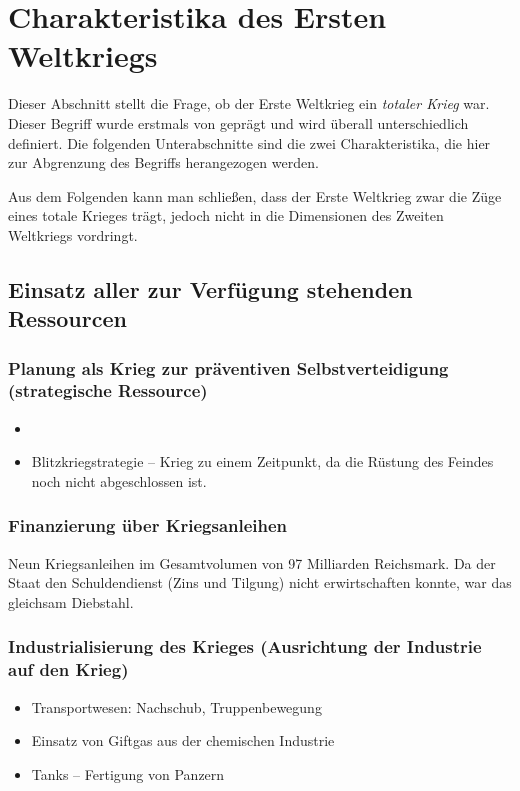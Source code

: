 \section{Charakteristika des Ersten Weltkriegs}

Dieser Abschnitt stellt die Frage, ob der Erste Weltkrieg ein
\emph{totaler Krieg} war. Dieser Begriff wurde erstmals von
 geprägt und wird überall
unterschiedlich definiert. Die folgenden Unterabschnitte sind die zwei
Charakteristika, die hier zur Abgrenzung des Begriffs herangezogen
werden.

Aus dem Folgenden kann man schließen, dass der Erste Weltkrieg zwar
die Züge eines totale Krieges trägt, jedoch nicht in die Dimensionen
des Zweiten Weltkriegs vordringt.


\subsection*{Einsatz aller zur Verfügung stehenden Ressourcen}

\subsubsection{Planung als Krieg zur präventiven Selbstverteidigung
(strategische Ressource)}

\begin{itemize}
\item {}
\item Blitzkriegstrategie -- Krieg zu einem Zeitpunkt, da die Rüstung
des Feindes noch nicht abgeschlossen ist.
\end{itemize}


\subsubsection{Finanzierung über Kriegsanleihen}

Neun Kriegsanleihen im Gesamtvolumen von 97 Milliarden Reichsmark. Da
der Staat den Schuldendienst (Zins und Tilgung) nicht erwirtschaften
konnte, war das gleichsam Diebstahl.


\subsubsection{Industrialisierung des Krieges (Ausrichtung der
Industrie auf den Krieg)}

\begin{itemize}
\item Transportwesen: Nachschub, Truppenbewegung
\item Einsatz von Giftgas aus der chemischen Industrie
\item Tanks -- Fertigung von Panzern 
\end{itemize}


